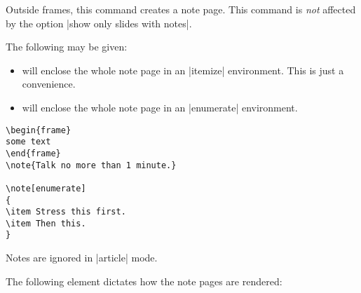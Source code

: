 \begin{command}{\note{}}
  Outside frames, this command creates a note page. This command is \emph{not} affected by the option |show only slides with notes|.

  The following  may be given:
  \begin{itemize}
  \item
     will enclose the whole note page in an |itemize| environment. This is just a convenience.
  \item
     will enclose the whole note page in an |enumerate| environment.
  \end{itemize}

  \example
\begin{verbatim}
\begin{frame}
some text
\end{frame}
\note{Talk no more than 1 minute.}

\note[enumerate]
{
\item Stress this first.
\item Then this.
}
\end{verbatim}

  \articlenote
  Notes are ignored in |article| mode.
\end{command}

The following element dictates how the note pages are rendered:

